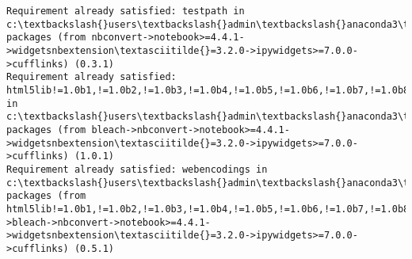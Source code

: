 \documentclass[11pt]{article}
\begin{document}
\begin{Verbatim}[commandchars=\\\{\}]
Requirement already satisfied: testpath in c:\textbackslash{}users\textbackslash{}admin\textbackslash{}anaconda3\textbackslash{}lib\textbackslash{}site-packages (from nbconvert->notebook>=4.4.1->widgetsnbextension\textasciitilde{}=3.2.0->ipywidgets>=7.0.0->cufflinks) (0.3.1)
Requirement already satisfied: html5lib!=1.0b1,!=1.0b2,!=1.0b3,!=1.0b4,!=1.0b5,!=1.0b6,!=1.0b7,!=1.0b8,>=0.99999999pre in c:\textbackslash{}users\textbackslash{}admin\textbackslash{}anaconda3\textbackslash{}lib\textbackslash{}site-packages (from bleach->nbconvert->notebook>=4.4.1->widgetsnbextension\textasciitilde{}=3.2.0->ipywidgets>=7.0.0->cufflinks) (1.0.1)
Requirement already satisfied: webencodings in c:\textbackslash{}users\textbackslash{}admin\textbackslash{}anaconda3\textbackslash{}lib\textbackslash{}site-packages (from html5lib!=1.0b1,!=1.0b2,!=1.0b3,!=1.0b4,!=1.0b5,!=1.0b6,!=1.0b7,!=1.0b8,>=0.99999999pre->bleach->nbconvert->notebook>=4.4.1->widgetsnbextension\textasciitilde{}=3.2.0->ipywidgets>=7.0.0->cufflinks) (0.5.1)

    \end{Verbatim}
\end{document}
